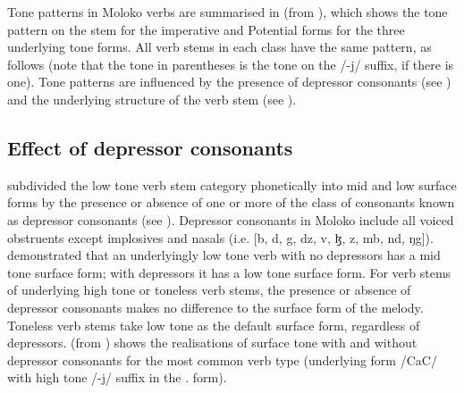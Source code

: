Tone patterns in Moloko verbs are summarised in  (from \citealt{FriesenMamalis2008}), which shows the tone pattern on the stem for the imperative and Potential forms for the three underlying tone forms.  All verb stems in each class have the same pattern, as follows (note that the tone in parentheses is the tone on the /-j/ suffix, if there is one). Tone patterns are influenced by the presence of depressor consonants (see ) and the underlying structure of the verb stem (see ).

\begin{table}
\caption{Summary of tone patterns for the three tone classes\label{tab:46}}
\end{table}

\subsection{Effect of depressor consonants}\label{sec:6.7.1}
\hypertarget{RefHeading1212041525720847}{}
\largerpage \citet{Bow1997c} subdivided the low tone verb stem category phonetically into mid and low surface forms by the presence or absence of one or more of the class of consonants known as depressor consonants (see ).  Depressor consonants in Moloko include all voiced obstruents except implosives and nasals (i.e. [b, d, g, dz, v, ɮ, \textit{}z, mb, nd, ŋg]). \citet{Bow1997c} demonstrated that an underlyingly low tone verb with no depressors has a mid tone surface form; with depressors it has a low tone surface form. For verb stems of underlying high tone or toneless verb stems, the presence or absence of depressor consonants makes no difference to the surface form of the melody.  Toneless verb stems take low tone as the default surface form, regardless of depressors.  (from \citealt{Bow1997c}) shows the realisations of surface tone with and without depressor consonants for the most common verb type (underlying form /CaC/ with high tone /-j/ suffix in the {\twoP}.{\IMP} form).

